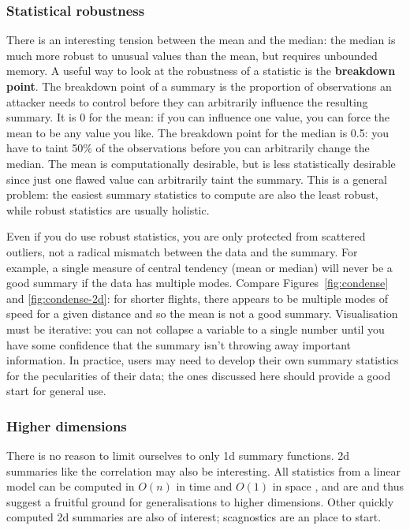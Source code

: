\documentclass[journal]{vgtc}                %
\begin{document}
\subsubsection{Statistical robustness}

There is an interesting tension between the mean and the median: the median is much more robust to unusual values than the mean, but requires unbounded memory. A useful way to look at the robustness of a statistic is the {\bf breakdown point}. The breakdown point of a summary is the proportion of observations an attacker needs to control before they can arbitrarily influence the resulting summary. It is 0 for the mean: if you can influence one value, you can force the mean to be any value you like. The breakdown point for the median is 0.5: you have to taint 50\% of the observations before you can arbitrarily change the median. The mean is computationally desirable, but is less statistically desirable since just one flawed value can arbitrarily taint the summary. This is a general problem: the easiest summary statistics to compute are also the least robust, while robust statistics are usually holistic.

Even if you do use robust statistics, you are only protected from scattered outliers, not a radical mismatch between the data and the summary. For example, a single measure of central tendency (mean or median) will never be a good summary if the data has multiple modes. Compare Figures~\ref{fig:condense} and \ref{fig:condense-2d}: for shorter flights, there appears to be multiple modes of speed for a given distance and so the mean is not a good summary. Visualisation must be iterative: you can not collapse a variable to a single number until you have some confidence that the summary isn't throwing away important information. In practice, users may need to develop their own summary statistics for the pecularities of their data; the ones discussed here should provide a good start for general use.

\subsubsection{Higher dimensions}

There is no reason to limit ourselves to only 1d summary functions. 2d summaries like the correlation may also be interesting. All statistics from a linear model can be computed in $O(n)$ in time and $O(1)$ in space \citep{miller:1992}, and are and thus suggest a fruitful ground for generalisations to higher dimensions. Other quickly computed 2d summaries are also of interest; scagnostics \citep{wilkinson:2005} are an place to start.
\end{document}
